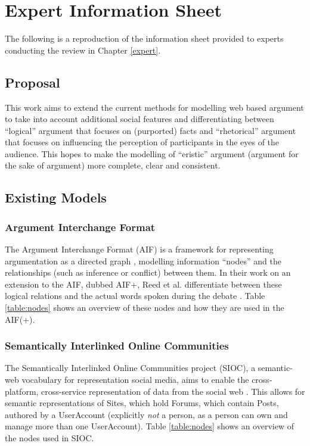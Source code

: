 \chapter{Expert Information Sheet}
\label{expertsheet}
The following is a reproduction of the information sheet provided to experts conducting the review in Chapter \ref{expert}.

\section{Proposal}
This work aims to extend the current methods for modelling web based argument to take into account additional social features and differentiating between ``logical'' argument that focuses on (purported) facts and ``rhetorical'' argument that focuses on influencing the perception of participants in the eyes of the audience. This hopes to make the modelling of ``eristic'' argument (argument for the sake of argument) more complete, clear and consistent.

\section{Existing Models}

\subsection{Argument Interchange Format}
The Argument Interchange Format (AIF) is a framework for representing argumentation as a directed graph \citep{Chesnevar2006}, modelling information ``nodes'' and the relationships (such as inference or conflict) between them. In their work on an extension to the AIF, dubbed AIF+, Reed et al. differentiate between these logical relations and the actual words spoken during the debate \citep{Reed2008}. Table \ref{table:nodes} shows an overview of these nodes and how they are used in the AIF(+).

\subsection{Semantically Interlinked Online Communities}
The Semantically Interlinked Online Communities project (SIOC), a semantic-web vocabulary for representation social media, aims to enable the cross-platform, cross-service representation of data from the social web \citep{Breslin2006}. This allows for semantic representations of Sites, which hold Forums, which contain Posts, authored by a UserAccount (explicitly \textit{not} a person, as a person can own and manage more than one UserAccount). Table \ref{table:nodes} shows an overview of the nodes used in SIOC.

